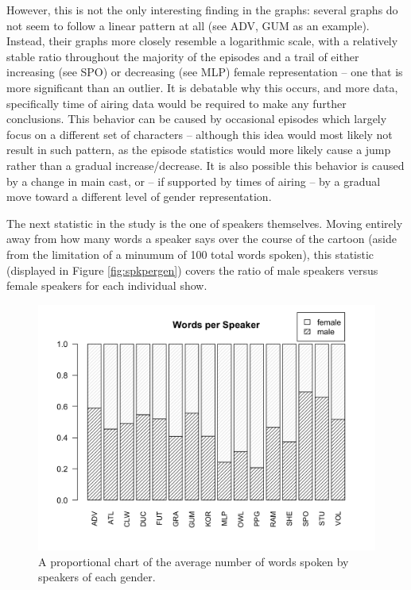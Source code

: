 \documentclass[a4paper, 11pt]{article}
\begin{document}
However, this is not the only interesting finding in the graphs: several graphs do not seem to follow a linear pattern at all (see ADV, GUM as an example). Instead, their graphs more closely resemble a logarithmic scale, with a relatively stable ratio throughout the majority of the episodes and a trail of either increasing (see SPO) or decreasing (see MLP) female representation -- one that is more significant than an outlier. It is debatable why this occurs, and more data, specifically time of airing data would be required to make any further conclusions. This behavior can be caused by occasional episodes which largely focus on a different set of characters -- although this idea would most likely not result in such pattern, as the episode statistics would more likely cause a jump rather than a gradual increase/decrease. It is also possible this behavior is caused by a change in main cast, or -- if supported by times of airing -- by a gradual move toward a different level of gender representation.

The next statistic in the study is the one of speakers themselves. Moving entirely away from how many words a speaker says over the course of the cartoon (aside from the limitation of a minumum of 100 total words spoken), this statistic (displayed in Figure \ref{fig:spkpergen}) covers the ratio of male speakers versus female speakers for each individual show.

\begin{figure}[t!]
  \includegraphics[width=\linewidth]{figures/worperspk.png}
  \caption{A proportional chart of the average number of words spoken by speakers of each gender.}
  \label{fig:worperspk}
\end{figure}
\end{document}
